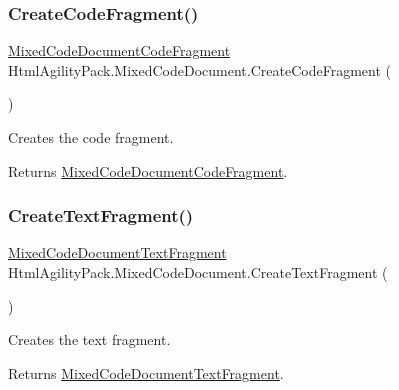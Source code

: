 \subsubsection{\texorpdfstring{Create\+Code\+Fragment()}{CreateCodeFragment()}}
{\footnotesize\ttfamily \hyperlink{class_html_agility_pack_1_1_mixed_code_document_code_fragment}{Mixed\+Code\+Document\+Code\+Fragment} Html\+Agility\+Pack.\+Mixed\+Code\+Document.\+Create\+Code\+Fragment (\begin{DoxyParamCaption}{ }\end{DoxyParamCaption})\hspace{0.3cm}{\ttfamily [inline]}}



Creates the code fragment. 

\begin{DoxyReturn}{Returns}
\hyperlink{class_html_agility_pack_1_1_mixed_code_document_code_fragment}{Mixed\+Code\+Document\+Code\+Fragment}.
\end{DoxyReturn}
\mbox{\label{class_html_agility_pack_1_1_mixed_code_document_ae20ea4c1e8d8fabdf255052e499d000c}} 
\subsubsection{\texorpdfstring{Create\+Text\+Fragment()}{CreateTextFragment()}}
{\footnotesize\ttfamily \hyperlink{class_html_agility_pack_1_1_mixed_code_document_text_fragment}{Mixed\+Code\+Document\+Text\+Fragment} Html\+Agility\+Pack.\+Mixed\+Code\+Document.\+Create\+Text\+Fragment (\begin{DoxyParamCaption}{ }\end{DoxyParamCaption})\hspace{0.3cm}{\ttfamily [inline]}}



Creates the text fragment. 

\begin{DoxyReturn}{Returns}
\hyperlink{class_html_agility_pack_1_1_mixed_code_document_text_fragment}{Mixed\+Code\+Document\+Text\+Fragment}.
\end{DoxyReturn}
\mbox{\label{class_html_agility_pack_1_1_mixed_code_document_a216b550a01ccd715a8e4fec262309051}} 
